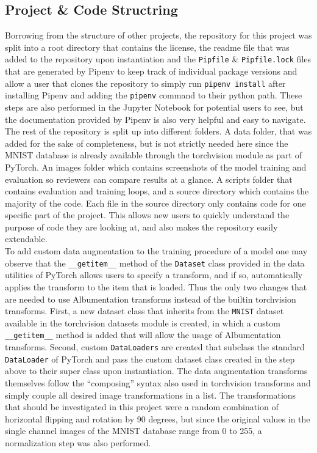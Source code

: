 \documentclass{article}
\begin{document}
\subsection{Project \& Code Structring}
Borrowing from the structure of other projects, the repository for this project was split into a root directory that contains the license, the readme file that was added to the repository upon instantiation and the \texttt{Pipfile} \& \texttt{Pipfile.lock} files that are generated by Pipenv to keep track of individual package versions and allow a user that clones the repository to simply run \texttt{pipenv install} after installing Pipenv and adding the \texttt{pipenv} command to their python path. These steps are also performed in the Jupyter Notebook for potential users to see, but the documentation provided by Pipenv is also very helpful and easy to navigate. \\
The rest of the repository is split up into different folders. A data folder, that was added for the sake of completeness, but is not strictly needed here since the MNIST database is already available through the torchvision module as part of PyTorch. An images folder which contains screenshots of the model training and evaluation so reviewers can compare results at a glance. A scripts folder that contains evaluation and training loops, and a source directory which contains the majority of the code. Each file in the source directory only contains code for one specific part of the project. This allows new users to quickly understand the purpose of code they are looking at, and also makes the repository easily extendable. \\
To add custom data augmentation to the training procedure of a model one may observe that the \texttt{\_\_getitem\_\_} method of the \texttt{Dataset} class provided in the data utilities of PyTorch allows users to specify a transform, and if so, automatically applies the transform to the item that is loaded. Thus the only two changes that are needed to use Albumentation transforms instead of the builtin torchvision transforms. First, a new dataset class that inherits from the \texttt{MNIST} dataset available in the torchvision datasets module is created, in which a custom \texttt{\_\_getitem\_\_} method is added that will allow the usage of Albumentation transforms. Second, custom \texttt{DataLoaders} are created that subclass the standard \texttt{DataLoader} of PyTorch and pass the custom dataset class created in the step above to their super class upon instantiation. The data augmentation transforms themselves follow the ``composing'' syntax also used in torchvision transforms and simply couple all desired image transformations in a list. The transformations that should be investigated in this project were a random combination of horizontal flipping and rotation by 90 degrees, but since the original values in the single channel images of the MNIST database range from 0 to 255, a normalization step was also performed. \\
\end{document}
